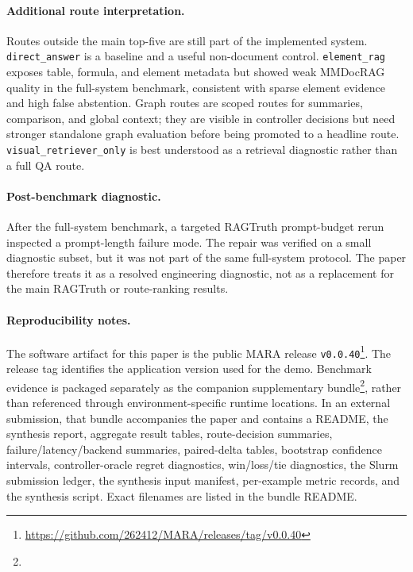 \paragraph{Additional route interpretation.}

Routes outside the main top-five are still part of the implemented system.
\texttt{direct\_answer} is a baseline and a useful non-document control.
\texttt{element\_rag} exposes table, formula, and element metadata but showed weak MMDocRAG quality in the full-system benchmark, consistent with sparse element evidence and high false abstention.
Graph routes are scoped routes for summaries, comparison, and global context; they are visible in controller decisions but need stronger standalone graph evaluation before being promoted to a headline route.
\texttt{visual\_retriever\_only} is best understood as a retrieval diagnostic rather than a full QA route.

\paragraph{Post-benchmark diagnostic.}

After the full-system benchmark, a targeted RAGTruth prompt-budget rerun inspected a prompt-length failure mode. The repair was verified on a small diagnostic subset, but it was not part of the same full-system protocol. The paper therefore treats it as a resolved engineering diagnostic, not as a replacement for the main RAGTruth or route-ranking results.

\paragraph{Reproducibility notes.}

The software artifact for this paper is the public MARA release \texttt{v0.0.40}\footnote{\url{https://github.com/262412/MARA/releases/tag/v0.0.40}}. The release tag identifies the application version used for the demo. Benchmark evidence is packaged separately as the companion supplementary bundle\footnote{}, rather than referenced through environment-specific runtime locations. In an external submission, that bundle accompanies the paper and contains a README, the synthesis report, aggregate result tables, route-decision summaries, failure/latency/backend summaries, paired-delta tables, bootstrap confidence intervals, controller-oracle regret diagnostics, win/loss/tie diagnostics, the Slurm submission ledger, the synthesis input manifest, per-example metric records, and the synthesis script. Exact filenames are listed in the bundle README.

